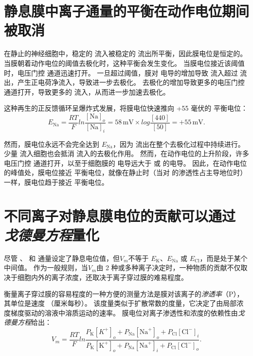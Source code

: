 \section{静息膜中离子通量的平衡在动作电位期间被取消}

在静止的神经细胞中，稳定的  流入被稳定的  流出所平衡，因此膜电位是恒定的。 
当膜朝着动作电位的阈值去极化时，这种平衡会发生变化。 
当膜电位接近该阈值时，电压门控  通道迅速打开。 
一旦超过阈值，膜对  电导的增加导致  流入超过  流出，产生正电荷净流入，导致进一步去极化。 
去极化的增加导致更多的电压门控  通道打开，导致更多的  流入，从而进一步加速去极化。


这种再生的正反馈循环呈爆炸式发展，将膜电位快速推向 +55 毫伏的  平衡电位：
\begin{equation} \label{eq:9_equilibrium_potential}
	E_{\text{Na}} = \frac{RT}{F} ln\frac{[\text{Na}]_o}{[\text{Na}]_i}
		   = 58 \, \text{mV} \times log\frac{[440]}{[50]}
		   = +55 \, \text{mV}.
\end{equation}



然而，膜电位永远不会完全达到 $E_\text{Na}$，因为  流出在整个去极化过程中持续进行。 
少量  流入细胞也会抵消  流入的去极化作用。
然而，在动作电位的上升阶段，许多电压门控  通道打开，以至于细胞膜的  电导远大于  或  的电导。 
因此，在动作电位的峰值处，膜电位接近  平衡电位，就像在静止时（当对  的渗透性占主导地位时）一样，膜电位趋于接近  平衡电位。


\section{不同离子对静息膜电位的贡献可以通过\textit{戈德曼方程}量化}
尽管 、 和  通量设定了静息电位值，但$V_m$不等于 $E_\text{K}$、$E_\text{Na}$ 或 $E_\text{Cl}$，而是处于某个中间值。 
作为一般规则，当$V_m$由 2 种或多种离子决定时，一种物质的贡献不仅取决于细胞内外的离子浓度，还取决于离子穿过膜的难易程度。


衡量离子穿过膜的容易程度的一种方便的测量方法是膜对该离子的\textit{渗透率}（P），其单位是速度 （厘米每秒）。 
该度量类似于扩散常数的度量，它决定了由局部浓度梯度驱动的溶液中溶质运动的速率。
膜电位对离子渗透性和浓度的依赖性由\textit{戈德曼方程}给出：
\begin{equation} \label{eq:9_Goldman_Equation}
	V_m = \frac{RT}{F}
		ln \frac{
			P_\text{K} [K^+]_o + 
			P_\text{Na}[\text{Na}^+]_o + 
			P_\text{Cl}[\text{Cl}^-]_i
		}
		{
			P_\text{K} [\text{K}^+]_o + 
			P_\text{Na}[\text{Na}^+]_i + 
			P_\text{Cl}[\text{Cl}^-]_o
		}.
\end{equation}


